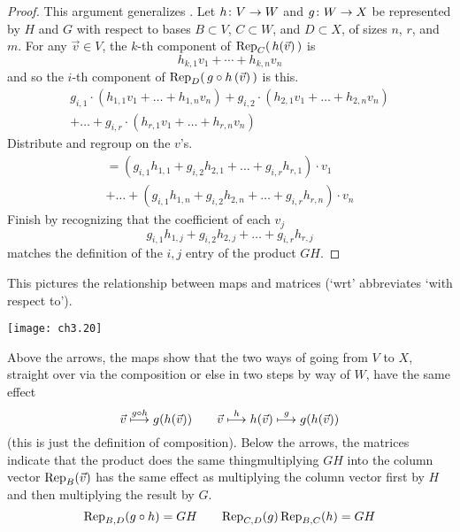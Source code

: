 \begin{proof}
This argument generalizes .
Let \( \map{h}{V}{W} \) and \( \map{g}{W}{X} \) be represented by
\( H \) and \( G \) with respect to bases
\( B\subset V \), \( C\subset W \), and \( D\subset X \), of sizes
\( n \), \( r \), and \( m \).
For any \( \vec{v}\in V \), the \( k \)-th component of
\( \rep{\,h(\vec{v})\,}{C} \) is
\begin{equation*}
  h_{k,1}v_1+\cdots+h_{k,n}v_n
\end{equation*}
and so the \( i \)-th component of
\( \rep{\,\composed{g}{h}\,(\vec{v})\,}{D} \) is this.
\begin{multline*}
  g_{i,1}\cdot(h_{1,1}v_1+\dots+h_{1,n}v_n)
  +g_{i,2}\cdot(h_{2,1}v_1+\dots+h_{2,n}v_n)  \\
  +\dots                                 
  +g_{i,r}\cdot(h_{r,1}v_1+\dots+h_{r,n}v_n)
\end{multline*}
Distribute and regroup on the \( v \)'s.
\begin{multline*}
  =(g_{i,1} h_{1,1}+g_{i,2} h_{2,1}+\dots+g_{i,r}h_{r,1})\cdot v_1    \\
   +\dots
   +(g_{i,1} h_{1,n}+g_{i,2} h_{2,n}
           +\dots+g_{i,r} h_{r,n})\cdot v_n
\end{multline*}
Finish by recognizing that the coefficient of each \( v_j \)
\begin{equation*}
  g_{i,1}h_{1,j}+g_{i,2}h_{2,j}+\dots+g_{i,r}h_{r,j}
\end{equation*}
matches the definition of the \( i,j \) entry of the  product \( GH \).
\end{proof}

This
pictures the relationship between maps and matrices
(`wrt' abbreviates `with respect to').
\begin{center}
  \texttt{[image: ch3.20]}
\end{center}
Above the arrows, the maps show that the two ways of going from 
\( V \) to \( X \),
straight over via the composition or else in two steps by way of \( W \),
have the same effect 
\begin{equation*}
  \vec{v}\mapsunder{g\circ h}g(h(\vec{v}))
  \qquad
  \vec{v}\mapsunder{h}h(\vec{v})\mapsunder{g}g(h(\vec{v}))
\end{equation*}
(this is just the definition of composition).
Below the arrows, the matrices indicate that the product
does the same thing\Dash multiplying
$GH$ into the column vector $\rep{\vec{v}}{B}$ has the same
effect as  multiplying the column vector first by $H$ 
and then multiplying the result by $G$.
\begin{equation*}
   \rep{\composed{g}{h}}{B,D}
   =GH
   \qquad
   \rep{g}{C,D}\,\rep{h}{B,C}=GH
\end{equation*}

